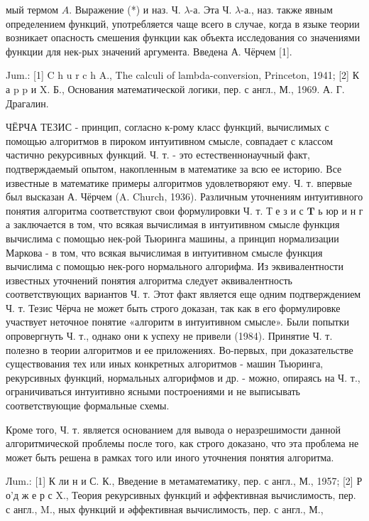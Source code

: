 \documentclass[10pt]{article}
\begin{document}
мый термом $A$. Выражение (*) и наз. Ч. $\lambda$-а. Эта Ч. $\lambda$-а., наз. также явным определением функций, употребляется чаще всего в случае, когда в языке теории возникает опасность смешения функции как объекта исследования со значениями функции для нек-рых значений аргумента. Введена А. Чёрчем [1].



Jum.: [1] C h u r c h A., The calculi of lambda-conversion, Princeton, 1941; [2] К а p p и X. Б., Основания математической логики, пер. с англ., М., 1969. А. Г. Драгалин.



ЧЁРЧА ТЕЗИС - принцип, согласно к-рому класс функций, вычислимых с помощью алгоритмов в пироком интуитивном смысле, совпадает с классом частично рекурсивных функций. Ч. т. - это естественнонаучный факт, подтверждаемый опытом, накопленным в математике за всю ее историю. Все известные в математике примеры алгоритмов удовлетворяют ему. Ч. т. впервые был высказан А. Чёрчем (A. Church, 1936). Различным уточнениям интуитивного понятия алгоритма соответствуют свои формулировки Ч. т. Т е з и с $\mathbf{T}$ ь юр и н г а заключается в том, что всякая вычислимая в интуитивном смысле функция вычислима с помощью нек-рой Тьюринга машины, а принцип нормализации Маркова - в том, что всякая вычислимая в интуитивном смысле функция вычислима с помощью нек-рого нормального алгорифма. Из эквивалентности известных уточнений понятия алгоритма следует әквивалентность соответствующих вариантов Ч. т. Этот факт является еще одним подтверждением Ч. т. Тезис Чёрча не может быть строго доказан, так как в его формулировке участвует неточное понятие «алгоритм в интуитивном смысле». Были попытки опровергнуть Ч. т., однако они к успеху не привели (1984). Принятие Ч. т. полезно в теории алгоритмов и ее приложениях. Во-первых, при доказательстве существования тех или иных конкретных алгоритмов - машин Тьюринга, рекурсивных функций, нормальных алгорифмов и др. - можно, опираясь на Ч. т., ограничиваться интуитивно ясными построениями и не выписывать соответствующие формальные схемы.



Кроме того, Ч. т. является основанием для вывода о неразрешимости данной алгоритмической проблемы после того, как строго доказано, что эта проблема не может быть решена в рамках того или иного уточнения понятия алгоритма.



Лum.: [1] К ли н и С. К., Введение в метаматематику, пер. с англ., М., 1957; [2] Р о'д ж е р с X., Теория рекурсивных функций и әффективная вычислимость, пер. с англ., M., ных функций и әффективная вычислимость, пер. с англ., М.,
\end{document}
